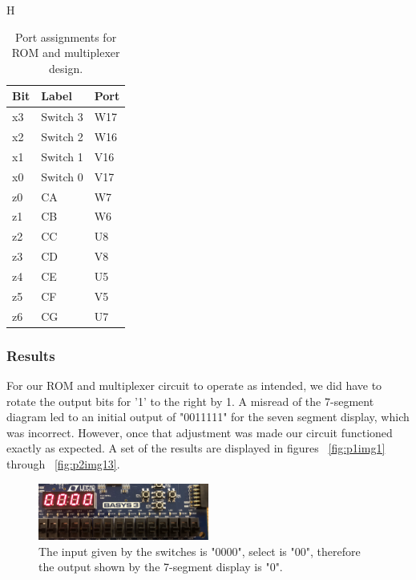 \documentclass[11pt]{article}
\begin{document}
\begin{table}{H}
\begin{center}
\begin{tabular}{| l | l | l |}
	\hline
	Bit & Label & Port \\ \hline
	x3 & Switch 3 & W17 \\ \hline
	x2 & Switch 2 & W16 \\ \hline
	x1 & Switch 1 & V16 \\ \hline
	x0 & Switch 0 & V17 \\ \hline
	z0 & CA & W7 \\ \hline
	z1 & CB & W6 \\ \hline
	z2 & CC & U8 \\ \hline
	z3 & CD & V8 \\ \hline
	z4 & CE & U5 \\ \hline
	z5 & CF & V5 \\ \hline
	z6 & CG & U7 \\ \hline
\end{tabular}
\caption{\label{tab:romMuxPorts}Port assignments for ROM and multiplexer design.}
\end{center}
\end{table}

\subsubsection{Results}
For our ROM and multiplexer circuit to operate as intended, we did have to rotate the output bits for '1' to the right by 1. A misread of the 7-segment diagram led to an initial output of "0011111" for the seven segment display, which was incorrect. However, once that adjustment was made our circuit functioned exactly as expected. A set of the results are displayed in figures ~\ref{fig:p1img1} through ~\ref{fig:p2img13}.

\begin{figure}[H]
\begin{center}
	\includegraphics[width=0.5\textwidth]{../report-images/Part2/IMG_3095.jpg}
	\caption{\label{fig:p2img1}The input given by the switches is "0000", select is "00", therefore the output shown by the 7-segment display is "0".}
\end{center}
\end{figure}
\end{document}
